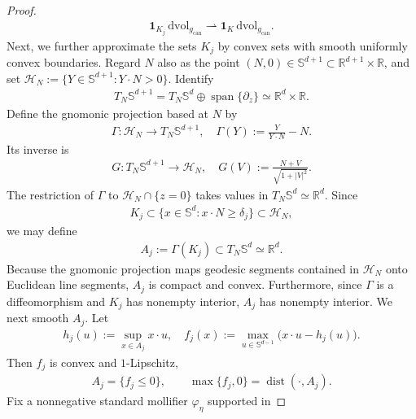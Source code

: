\documentclass[11pt,reqno]{amsart}
\numberwithin{equation}{section}
\theoremstyle{definition}
\theoremstyle{remark}
\def\bR {\mathbb{R}}
\def\bS {\mathbb{S}}
\def\cH {\mathcal{H}}
\newcommand{\wto}{\rightharpoonup}
\newcommand{\dist}{\operatorname{dist}}
\newcommand{\0}{\emptyset}
\newcommand{\can}{\mathrm{can}}
\newcommand{\dvol}{\,\mathrm{dvol}}
\begin{document}
\begin{proof}
\begin{align}\label{eq:hemisphere-pancake-truncation-limit}
        \mathbf{1}_{K_j}\dvol_{g_{\can}}
        \wto
        \mathbf{1}_K\dvol_{g_{\can}}.
\end{align}
Next, we further approximate the sets $K_j$ by convex sets with smooth uniformly
convex boundaries. Regard $N$ also as the point $(N,0)\in\bS^{d+1}\subset\bR^{d+1}\times\bR$,
and set $\cH_N:=\{Y\in\bS^{d+1}:Y\cdot N>0\}.$ Identify
\begin{align}
        T_N\bS^{d+1}
        =
        T_N\bS^d\oplus\operatorname{span}\{\partial_z\}
        \simeq
        \bR^d\times\bR.
\end{align}
Define the gnomonic projection based at $N$ by
\begin{align}
        \Gamma:\cH_N
        \rightarrow
        T_N\bS^{d+1},\quad 
        \Gamma(Y)
        :=
        \frac{Y}{Y\cdot N}-N.
\end{align}
Its inverse is
\begin{align}
        G:T_N\bS^{d+1}
        \rightarrow
        \cH_N,\quad 
        G(V)
        :=
        \frac{N+V}{\sqrt{1+|V|^2}}.
\end{align}
The restriction of $\Gamma$ to
$\cH_N\cap\{z=0\}$ takes values in
$T_N\bS^d\simeq\bR^d$. Since
\begin{align}
        K_j
        \subset
        \{x\in\bS^d:x\cdot N\geq\delta_j\}
        \subset
        \cH_N,
\end{align}
we may define
\begin{align}
        A_j
        :=
        \Gamma(K_j)
        \subset
        T_N\bS^d
        \simeq
        \bR^d.
\end{align}
Because the gnomonic projection maps geodesic segments contained in
$\cH_N$ onto Euclidean line segments, $A_j$ is compact and convex.
Furthermore, since $\Gamma$ is a diffeomorphism and $K_j$ has nonempty
interior, $A_j$ has nonempty interior. We next smooth $A_j$. Let
\begin{align}
        h_j(u)
        :=
        \sup_{x\in A_j}x\cdot u,
        \quad 
        f_j(x)
        :=
        \max_{u\in\bS^{d-1}}\bigl(x\cdot u-h_j(u)\bigr).
\end{align}
Then $f_j$ is convex and $1$-Lipschitz,
\begin{align}
        A_j
        =
        \{f_j\leq0\},
        \qquad
        \max\{f_j,0\}
        =
        \dist(\cdot,A_j).
\end{align}
Fix a nonnegative standard mollifier $\varphi_\eta$ supported in

\end{proof}
\end{document}
